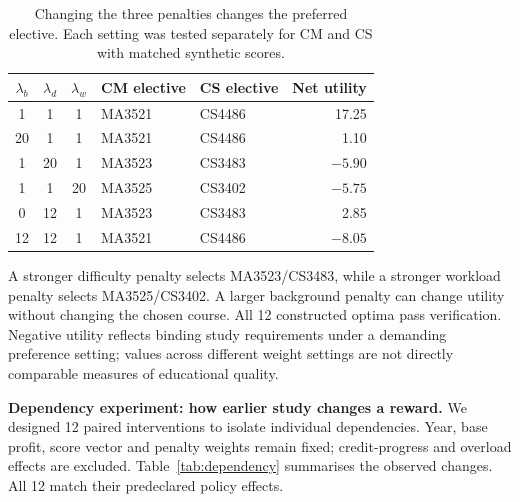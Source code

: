 \documentclass{article}
\begin{document}
\begin{table}[H]
\centering\small
\caption{Changing the three penalties changes the preferred elective. Each setting was tested separately for CM and CS with matched synthetic scores.}
\begin{tabular}{cccp{1.05in}p{1.05in}r}
\toprule
$\lambda_b$ & $\lambda_d$ & $\lambda_w$ & CM elective & CS elective & Net utility\\
\midrule
1 & 1 & 1 & MA3521 & CS4486 & 17.25\\
20 & 1 & 1 & MA3521 & CS4486 & 1.10\\
1 & 20 & 1 & MA3523 & CS3483 & $-5.90$\\
1 & 1 & 20 & MA3525 & CS3402 & $-5.75$\\
0 & 12 & 1 & MA3523 & CS3483 & 2.85\\
12 & 12 & 1 & MA3521 & CS4486 & $-8.05$\\
\bottomrule
\end{tabular}
\label{tab:lambda}
\end{table}

A stronger difficulty penalty selects MA3523/CS3483, while a stronger workload penalty selects MA3525/CS3402. A larger background penalty can change utility without changing the chosen course. All 12 constructed optima pass verification. Negative utility reflects binding study requirements under a demanding preference setting; values across different weight settings are not directly comparable measures of educational quality.

\textbf{Dependency experiment: how earlier study changes a reward.} We designed 12 paired interventions to isolate individual dependencies. Year, base profit, score vector and penalty weights remain fixed; credit-progress and overload effects are excluded. Table~\ref{tab:dependency} summarises the observed changes. All 12 match their predeclared policy effects.
\end{document}
